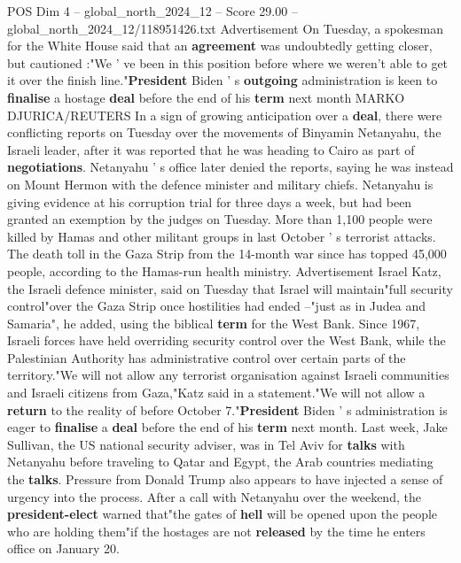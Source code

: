 \begin{textsample}{POS Dim 4 – global\_north\_2024\_12 – Score 29.00 – global\_north\_2024\_12/118951426.txt}
Advertisement On Tuesday, a spokesman for the White House said that an \textbf{agreement} was undoubtedly getting closer, but cautioned :"We ' ve been in this position before where we weren't able to get it over the finish line."\textbf{President} Biden ' s \textbf{outgoing} administration is keen to \textbf{finalise} a hostage \textbf{deal} before the end of his \textbf{term} next month MARKO DJURICA/REUTERS In a sign of growing anticipation over a \textbf{deal}, there were conflicting reports on Tuesday over the movements of Binyamin Netanyahu, the Israeli leader, after it was reported that he was heading to Cairo as part of \textbf{negotiations}.
Netanyahu ' s office later denied the reports, saying he was instead on Mount Hermon with the defence minister and military chiefs.
Netanyahu is giving evidence at his corruption trial for three days a week, but had been granted an exemption by the judges on Tuesday.
More than 1,100 people were killed by Hamas and other militant groups in last October ' s terrorist attacks.
The death toll in the Gaza Strip from the 14-month war since has topped 45,000 people, according to the Hamas-run health ministry.
Advertisement Israel Katz, the Israeli defence minister, said on Tuesday that Israel will maintain"full security control"over the Gaza Strip once hostilities had ended --"just as in Judea and Samaria", he added, using the biblical \textbf{term} for the West Bank.
Since 1967, Israeli forces have held overriding security control over the West Bank, while the Palestinian Authority has administrative control over certain parts of the territory."We will not allow any terrorist organisation against Israeli communities and Israeli citizens from Gaza,"Katz said in a statement."We will not allow a \textbf{return} to the reality of before October 7."\textbf{President} Biden ' s administration is eager to \textbf{finalise} a \textbf{deal} before the end of his \textbf{term} next month.
Last week, Jake Sullivan, the US national security adviser, was in Tel Aviv for \textbf{talks} with Netanyahu before traveling to Qatar and Egypt, the Arab countries mediating the \textbf{talks}.
Pressure from Donald Trump also appears to have injected a sense of urgency into the process.
After a call with Netanyahu over the weekend, the \textbf{president-elect} warned that"the gates of \textbf{hell} will be opened upon the people who are holding them"if the hostages are not \textbf{released} by the time he enters office on January 20.

\end{textsample}

